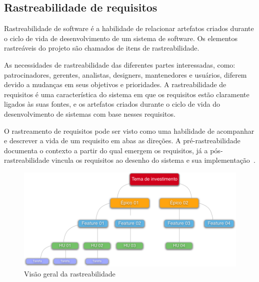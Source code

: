 \subsection{Rastreabilidade de requisitos}
Rastreabilidade de software é a habilidade de relacionar artefatos criados durante o ciclo de vida de desenvolvimento de um sistema de software. Os elementos rastreáveis do projeto são chamados de itens de rastreabilidade.

As necessidades de rastreabilidade das diferentes partes interessadas, como: patrocinadores, gerentes, analistas, designers, mantenedores e usuários, diferem devido a mudanças em seus objetivos e prioridades. A rastreabilidade de requisitos é uma característica do sistema em que os requisitos estão claramente ligados às suas fontes, e os artefatos criados durante o ciclo de vida do desenvolvimento de sistemas com base nesses requisitos.

O rastreamento de requisitos pode ser visto como uma habilidade de acompanhar e descrever a vida de um requisito em abas as direções. A pré-rastreabilidade documenta o contexto a partir do qual emergem os requisitos, já a pós-rastreabilidade vincula os requisitos ao desenho do sistema e sua implementação~\cite{davis}.

  \begin{figure}[!htbp]
    \centering
    \includegraphics[scale=0.45]{figuras/matriz_rastreabilidade}
    \caption[Visão geral da rastreabilidade]{Visão geral da rastreabilidade\footnotemark}
    \label{Rastreabilidade}
  \end{figure}
